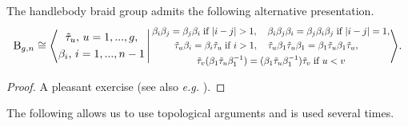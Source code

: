 \documentclass[a4paper,11pt]{amsart}
\newcommand{\eg}{\textsl{e.g.}}
\renewcommand{\dots}{\text{...}}
\newcommand{\setstuff}[1]{\mathrm{#1}}
\numberwithin{equation}{section}
\begin{document}
\begin{proposition}\label{proposition:alternative-presentation}
The handlebody braid group admits the following alternative presentation.
\begin{gather*}
\setstuff{B}_{g,n}\cong
\Bigg\langle
\begin{gathered}
\tilde{\tau}_{u},\,u=1,\dots,g,
\\
\beta_{i},\,i=1,\dots,n-1
\end{gathered}
\,\Bigg\vert\,
\scalebox{0.85}{$
\begin{gathered}
\beta_{i}\beta_{j}=\beta_{j}\beta_{i}\;\text{if }|i-j|>1,\quad
\beta_{i}\beta_{j}\beta_{i}=\beta_{j}\beta_{i}\beta_{j}\;\text{if }|i-j|=1,
\\
\tilde{\tau}_{u}\beta_{i}
=\beta_{i}\tilde{\tau}_{u}\;\text{if }i>1,
\quad
\tilde{\tau}_{u}\beta_{1}\tilde{\tau}_{u}\beta_{1}
=
\beta_{1}\tilde{\tau}_{u}\beta_{1}\tilde{\tau}_{u},
\quad
\\
\tilde{\tau}_{v}(\beta_{1}\tilde{\tau}_{u}\beta_{1}^{-1})
=(\beta_{1}\tilde{\tau}_{u}\beta_{1}^{-1})\tilde{\tau}_{v}
\;\text{if }u<v
\end{gathered}
$}
\Bigg\rangle.
\end{gather*}
\end{proposition}

\begin{proof}
A pleasant exercise (see also {\eg} \cite[Section 5]{HaOlLa-handlebodies}).
\end{proof}

The following allows us to use topological 
arguments and is used several times.
\end{document}
